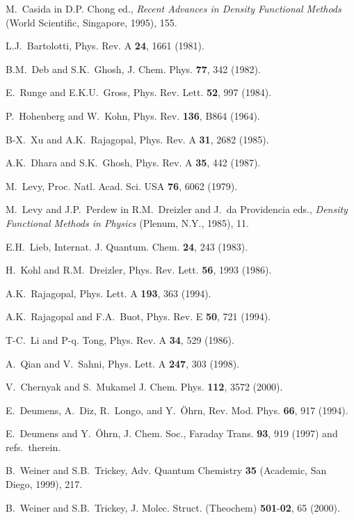 \begin{references}
 M.~Casida in D.P. Chong ed., {\it Recent Advances in
Density Functional Methods} (World Scientific, Singapore, 1995), 155.

 L.J.~Bartolotti, Phys. Rev. A {\bf 24}, 1661 (1981).

 B.M.~Deb and S.K.~Ghosh, J. Chem. Phys. {\bf 77}, 342
(1982).

 E.~Runge and E.K.U.~Gross, Phys. Rev. Lett. {\bf 52}, 997
(1984).

 P.~Hohenberg and W.~Kohn, Phys. Rev. {\bf 136}, B864 (1964).

 B-X.~Xu and A.K.~Rajagopal, Phys. Rev. A {\bf 31}, 2682
(1985).

 A.K.~Dhara and S.K.~Ghosh, Phys. Rev. A {\bf 35}, 442
(1987).

 M.~Levy, Proc. Natl. Acad. Sci. USA {\bf 76}, 6062 (1979).

 M.~Levy and J.P.~Perdew in R.M.~Dreizler and J.~da
Providencia eds., {\it Density Functional Methods in Physics} (Plenum, N.Y.,
1985), 11.

 E.H.~Lieb, Internat. J. Quantum. Chem. {\bf 24}, 243 (1983).

 H.~Kohl and R.M.~Dreizler, Phys. Rev. Lett. {\bf 56}, 1993
(1986).

 A.K.~Rajagopal, Phys. Lett. A {\bf 193}, 363 (1994).

 A.K.~Rajagopal and F.A.~Buot, Phys. Rev. E {\bf 50},
721 (1994).

 T-C.~Li and P-q. Tong, Phys. Rev. A {\bf 34}, 529 (1986).

 A.~Qian and V.~Sahni, Phys. Lett. A {\bf 247}, 303 (1998).

 V.~Chernyak and S.~Mukamel J. Chem. Phys. {\bf 112},
3572 (2000).

 E.~Deumens, A.~Diz, R.~Longo, and Y.~{\"O}hrn, Rev. Mod.
Phys. {\bf 66}, 917 (1994).

 E.~Deumens and Y.~{\"O}hrn, J. Chem. Soc., Faraday Trans. 
{\bf 93}, 919 (1997) and refs.~therein.

 B.~Weiner and S.B.~Trickey, Adv. Quantum Chemistry {\bf %
35} (Academic, San Diego, 1999), 217.

 B.~Weiner and S.B.~Trickey, J. Molec. Struct. (Theochem) 
{\bf 501}-{\bf 02}, 65 (2000).


\end{references}
